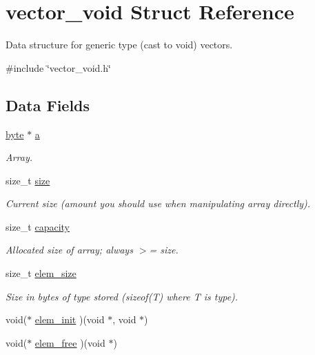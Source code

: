 \hypertarget{structvector__void}{\section{vector\-\_\-void Struct Reference}
\label{structvector__void}
}


Data structure for generic type (cast to void) vectors.  




{\ttfamily \#include \char`\"{}vector\-\_\-void.\-h\char`\"{}}

\subsection*{Data Fields}
\begin{DoxyCompactItemize}
\item 
\hyperlink{vector__void_8h_a0c8186d9b9b7880309c27230bbb5e69d}{byte} $\ast$ \hyperlink{structvector__void_aae6cbf085d4de1f6ba3adab1aa7c7585}{a}
\begin{DoxyCompactList}\small\item\em Array. \end{DoxyCompactList}\item 
size\-\_\-t \hyperlink{structvector__void_a94e09482f6122993461724a988ae6f92}{size}
\begin{DoxyCompactList}\small\item\em Current size (amount you should use when manipulating array directly). \end{DoxyCompactList}\item 
size\-\_\-t \hyperlink{structvector__void_a440146243caeb1d285111fdd54e1006f}{capacity}
\begin{DoxyCompactList}\small\item\em Allocated size of array; always $>$= size. \end{DoxyCompactList}\item 
size\-\_\-t \hyperlink{structvector__void_afedda26ce85492462b79dae9090c49f6}{elem\-\_\-size}
\begin{DoxyCompactList}\small\item\em Size in bytes of type stored (sizeof(\-T) where T is type). \end{DoxyCompactList}\item 
void($\ast$ \hyperlink{structvector__void_af5d27d7e1af89d5dfbcf49f1810cc0c2}{elem\-\_\-init} )(void $\ast$, void $\ast$)
\item 
void($\ast$ \hyperlink{structvector__void_abed2ac06e76256419b825b31e879b204}{elem\-\_\-free} )(void $\ast$)
\end{DoxyCompactItemize}


